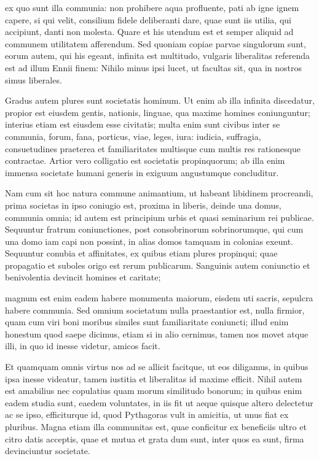  ex quo sunt illa communia: non prohibere aqua profluente, pati ab igne ignem capere, si qui velit, consilium fidele deliberanti dare, quae sunt iis utilia, qui accipiunt, danti non molesta. Quare et his utendum est et semper aliquid ad communem utilitatem afferendum. Sed quoniam copiae parvae singulorum sunt, eorum autem, qui his egeant, infinita est multitudo, vulgaris liberalitas referenda est ad illum Ennii finem: Nihilo minus ipsi lucet, ut facultas sit, qua in nostros simus liberales.

 Gradus autem plures sunt societatis hominum. Ut enim ab illa infinita discedatur, propior est eiusdem gentis, nationis, linguae, qua maxime homines coniunguntur; interius etiam est eiusdem esse civitatis; multa enim sunt civibus inter se communia, forum, fana, porticus, viae, leges, iura: iudicia, suffragia, consuetudines praeterea et familiaritates multisque cum multis res rationesque contractae. Artior vero colligatio est societatis propinquorum; ab illa enim immensa societate humani generis in exiguum angustumque concluditur.

 Nam cum sit hoc natura commune animantium, ut habeant libidinem procreandi, prima societas in ipso coniugio est, proxima in liberis, deinde una domus, communia omnia; id autem est principium urbis et quasi seminarium rei publicae. Sequuntur fratrum coniunctiones, post consobrinorum sobrinorumque, qui cum una domo iam capi non possint, in alias domos tamquam in colonias exeunt. Sequuntur conubia et affinitates, ex quibus etiam plures propinqui; quae propagatio et suboles origo est rerum publicarum. Sanguinis autem coniunctio et benivolentia devincit homines et caritate;

 magnum est enim eadem habere monumenta maiorum, eisdem uti sacris, sepulcra habere communia. Sed omnium societatum nulla praestantior est, nulla firmior, quam cum viri boni moribus similes sunt familiaritate coniuncti; illud enim honestum quod saepe dicimus, etiam si in alio cernimus, tamen nos movet atque illi, in quo id inesse videtur, amicos facit.

 Et quamquam omnis virtus nos ad se allicit facitque, ut eos diligamus, in quibus ipsa inesse videatur, tamen iustitia et liberalitas id maxime efficit. Nihil autem est amabilius nec copulatius quam morum similitudo bonorum; in quibus enim eadem studia sunt, eaedem voluntates, in iis fit ut aeque quisque altero delectetur ac se ipso, efficiturque id, quod Pythagoras vult in amicitia, ut unus fiat ex pluribus. Magna etiam illa communitas est, quae conficitur ex beneficiis ultro et citro datis acceptis, quae et mutua et grata dum sunt, inter quos ea sunt, firma devinciuntur societate.

